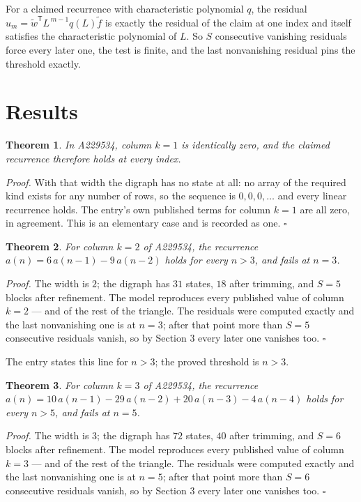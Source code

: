 \documentclass[11pt]{article}
\newtheorem{theorem}{Theorem}
\theoremstyle{definition}
\begin{document}
For a claimed recurrence with characteristic polynomial $q$, the residual $u_m = \tilde w^{\mathsf T}L^{\,m-1}q(L)\tilde f$ is exactly the residual of the claim at one index and itself satisfies the characteristic polynomial of $L$. So $S$ consecutive vanishing residuals force every later one, the test is finite, and the last nonvanishing residual pins the threshold exactly.

\section{Results}

\begin{theorem} In A229534, column $k = 1$ is identically zero, and the claimed recurrence therefore holds at every index.\end{theorem}

{\itshape Proof.} With that width the digraph has no state at all: no array of the required kind exists for any number of rows, so the sequence is $0,0,0,\dots$ and every linear recurrence holds. The entry's own published terms for column $k = 1$ are all zero, in agreement. This is an elementary case and is recorded as one. $\square$

\begin{theorem} For column $k = 2$ of A229534, the recurrence $a(n) = 6\,a(n-1) - 9\,a(n-2)$ holds for every $n > 3$, and fails at $n = 3$.\end{theorem}

{\itshape Proof.} The width is $2$; the digraph has $31$ states, $18$ after trimming, and $S = 5$ blocks after refinement. The model reproduces every published value of column $k = 2$ --- and of the rest of the triangle. The residuals were computed exactly and the last nonvanishing one is at $n = 3$; after that point more than $S = 5$ consecutive residuals vanish, so by Section 3 every later one vanishes too. $\square$

The entry states this line for $n > 3$; the proved threshold is $n > 3$.

\begin{theorem} For column $k = 3$ of A229534, the recurrence $a(n) = 10\,a(n-1) - 29\,a(n-2) + 20\,a(n-3) - 4\,a(n-4)$ holds for every $n > 5$, and fails at $n = 5$.\end{theorem}

{\itshape Proof.} The width is $3$; the digraph has $72$ states, $40$ after trimming, and $S = 6$ blocks after refinement. The model reproduces every published value of column $k = 3$ --- and of the rest of the triangle. The residuals were computed exactly and the last nonvanishing one is at $n = 5$; after that point more than $S = 6$ consecutive residuals vanish, so by Section 3 every later one vanishes too. $\square$
\end{document}
